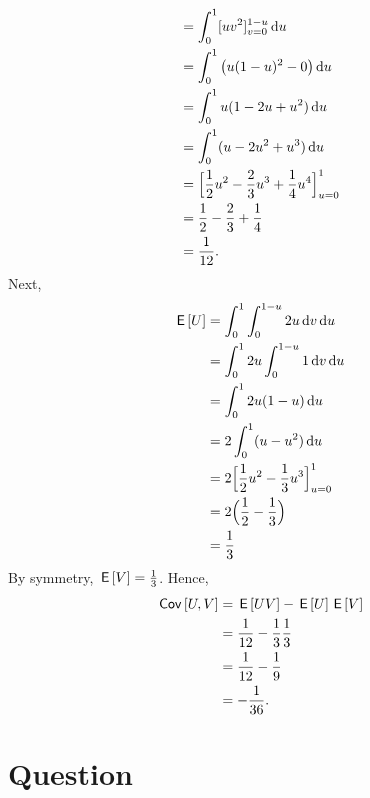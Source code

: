 \begin{exercise}
\begin{solution}
\begin{enumerate}
\begin{align}
        &= \int_0^1 [uv^2]_{v=0}^{1-u} \,\textrm{d}u \\
        &= \int_0^1 \big( u(1-u)^2 - 0\big) \,\textrm{d}u \\
        &= \int_0^1 u(1 - 2u + u^2) \,\textrm{d}u \\
        &= \int_0^1 (u - 2u^2 + u^3) \,\textrm{d}u \\
        &= \Big[ \frac{1}{2}u^2 - \frac{2}{3}u^3 + \frac{1}{4}u^4 \Big]_{u=0}^1 \\
        &= \frac{1}{2} - \frac{2}{3} + \frac{1}{4} \\
        &= \frac{1}{12}.
    \end{align}
    Next,
    \begin{align}
        \,\mathsf{E}\left[U\right] &= \int_0^1 \int_0^{1-u} 2 u \,\textrm{d}v \,\textrm{d}u \\
        &= \int_0^1 2 u \int_0^{1-u} 1 \,\textrm{d}v \,\textrm{d}u \\
        &= \int_0^1 2 u(1-u) \,\textrm{d}u \\
        &= 2 \int_0^1 (u - u^2) \,\textrm{d}u \\
        &= 2  \Big[\frac{1}{2}u^2 - \frac{1}{3}u^3\Big]_{u=0}^1 \\
        &= 2 \Big(\frac{1}{2} - \frac{1}{3}\Big) \\
        &= \frac{1}{3}
    \end{align}
    By symmetry, $\,\mathsf{E}\left[V\right] = \frac{1}{3}$. Hence,
    \begin{align}
        \,\mathsf{Cov}\left[U,V\right] &= \,\mathsf{E}\left[UV\right] - \,\mathsf{E}\left[U\right]\,\mathsf{E}\left[V\right] \\
        &= \frac{1}{12} - \frac{1}{3}\frac{1}{3}\\
        &= \frac{1}{12} - \frac{1}{9} \\
        &= -\frac{1}{36}.
    \end{align}
\end{enumerate}
\end{solution}
\end{exercise}

\section{Question}



